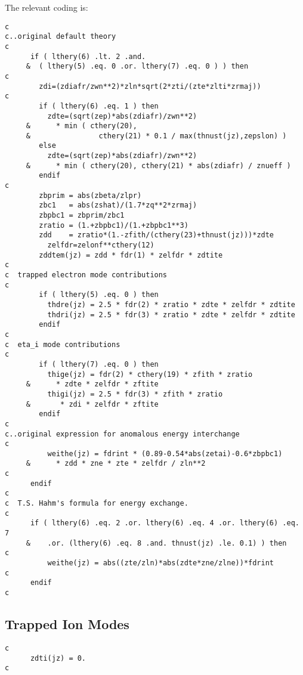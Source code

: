 The relevant coding is:

\begin{verbatim}
c
c..original default theory
c
      if ( lthery(6) .lt. 2 .and.
     &  ( lthery(5) .eq. 0 .or. lthery(7) .eq. 0 ) ) then
c
        zdi=(zdiafr/zwn**2)*zln*sqrt(2*zti/(zte*zlti*zrmaj))
c
        if ( lthery(6) .eq. 1 ) then
          zdte=(sqrt(zep)*abs(zdiafr)/zwn**2)
     &      * min ( cthery(20),
     &                cthery(21) * 0.1 / max(thnust(jz),zepslon) )
        else
          zdte=(sqrt(zep)*abs(zdiafr)/zwn**2)
     &      * min ( cthery(20), cthery(21) * abs(zdiafr) / znueff )
        endif
c
        zbprim = abs(zbeta/zlpr)
        zbc1   = abs(zshat)/(1.7*zq**2*zrmaj)
        zbpbc1 = zbprim/zbc1
        zratio = (1.+zbpbc1)/(1.+zbpbc1**3)
        zdd    = zratio*(1.-zfith/(cthery(23)+thnust(jz)))*zdte
          zelfdr=zelonf**cthery(12)
        zddtem(jz) = zdd * fdr(1) * zelfdr * zdtite
c
c  trapped electron mode contributions
c
        if ( lthery(5) .eq. 0 ) then
          thdre(jz) = 2.5 * fdr(2) * zratio * zdte * zelfdr * zdtite
          thdri(jz) = 2.5 * fdr(3) * zratio * zdte * zelfdr * zdtite
        endif
c
c  eta_i mode contributions
c
        if ( lthery(7) .eq. 0 ) then
          thige(jz) = fdr(2) * cthery(19) * zfith * zratio
     &      * zdte * zelfdr * zftite
          thigi(jz) = 2.5 * fdr(3) * zfith * zratio
     &       * zdi * zelfdr * zftite
        endif
c
c..original expression for anomalous energy interchange
c
          weithe(jz) = fdrint * (0.89-0.54*abs(zetai)-0.6*zbpbc1)
     &      * zdd * zne * zte * zelfdr / zln**2
c
      endif
c
c  T.S. Hahm's formula for energy exchange.
c
      if ( lthery(6) .eq. 2 .or. lthery(6) .eq. 4 .or. lthery(6) .eq. 7
     &    .or. (lthery(6) .eq. 8 .and. thnust(jz) .le. 0.1) ) then
c
          weithe(jz) = abs((zte/zln)*abs(zdte*zne/zlne))*fdrint
c
      endif
c
\end{verbatim}


\subsection{Trapped Ion Modes}

\begin{verbatim}
c
      zdti(jz) = 0.
c
\end{verbatim}


